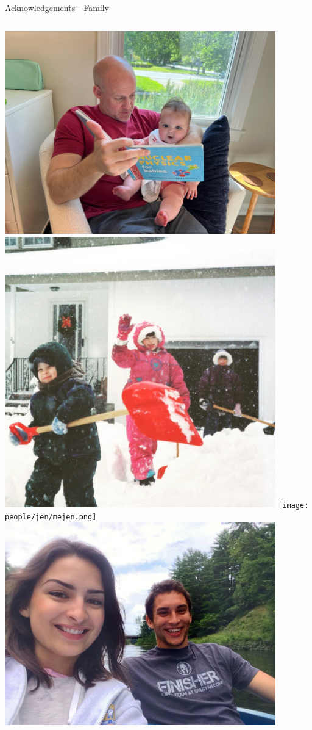 \documentclass[aspectratio=169]{beamer}
\begin{document}
\begin{frame}{Acknowledgements - Family}
    \begin{columns}
            \includegraphics[width=0.88\textwidth]{people/jen/matt_and_maddie_nuc.jpg}
            \includegraphics[width=0.88\textwidth]{people/jen/mejenyoung.png}
            \texttt{[image: people/jen/mejen.png]}
            \includegraphics[width=0.88\textwidth]{people/jen/mejenboat.png}


\end{columns}
\end{frame}
\end{document}
